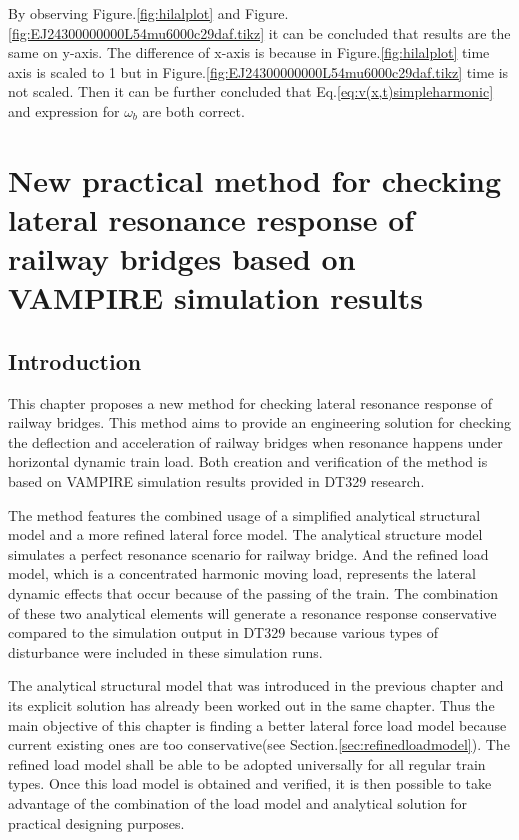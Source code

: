 By observing Figure.\ref{fig:hilalplot} and Figure.\ref{fig:EJ24300000000L54mu6000c29daf.tikz} it can be concluded that results are the same on y-axis. The difference of x-axis is because in Figure.\ref{fig:hilalplot} time axis is scaled to 1 but in Figure.\ref{fig:EJ24300000000L54mu6000c29daf.tikz} time is not scaled. Then it can be further concluded that Eq.\ref{eq:v(x,t)simpleharmonic} and expression for $\omega_b$ are both correct.


\chapter{New practical method for checking lateral resonance response of railway bridges based on VAMPIRE simulation results }\label{sec:parcticalmethod}

\section{Introduction}

This chapter proposes a new method for checking lateral resonance response of railway bridges. This method aims to provide an engineering solution for checking the deflection and acceleration of railway bridges when resonance happens under horizontal dynamic train load. Both creation and verification of the method is based on VAMPIRE simulation results provided in DT329 research.

The method features the combined usage of a simplified analytical structural model and a more refined lateral force model. The analytical structure model simulates a perfect resonance scenario for railway bridge. And the refined load model, which is a concentrated harmonic moving load, represents the lateral dynamic effects that occur because of the passing of the train. The combination of these two analytical elements will generate a resonance response conservative compared to the simulation output in DT329 because various types of disturbance were included in these simulation runs.

The analytical structural model that was introduced in the previous chapter and its explicit solution has already been worked out in the same chapter. Thus the main objective of this chapter is finding a better lateral force load model because current existing ones are too conservative(see Section.\ref{sec:refinedloadmodel}). The refined load model shall be able to be adopted universally for all regular train types. Once this load model is obtained and verified, it is then possible to take advantage of the combination of the load model and analytical solution for practical designing purposes.

